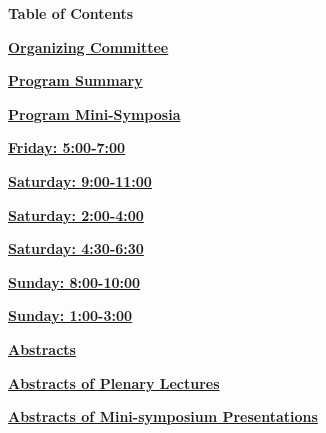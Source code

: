 \thispagestyle{empty}
\centerline{\bfseries\Large Table of Contents}
\vspace{10ex}

\noindent
\hyperref[committee]{{\bfseries\large  Organizing Committee}}
\vspace{2ex}

\vspace{4ex}
\noindent
\hyperref[programsummary]{{\bfseries\large  Program Summary}}
\vspace{2ex}

\vspace{4ex}
\noindent
\hyperref[program]{{\bfseries\large  Program Mini-Symposia}}
\vspace{2ex}

\hspace{2ex}
\hyperref[mini-friday]{{\bfseries\large  Friday: 5:00-7:00}}
\vspace{2ex}

\hspace{2ex}
\hyperref[mini-saturday1]{{\bfseries\large  Saturday: 9:00-11:00}}
\vspace{1ex}

\hspace{2ex}
\hyperref[mini-saturday2]{{\bfseries\large  Saturday: 2:00-4:00}}
\vspace{1ex}

\hspace{2ex}
\hyperref[mini-saturday3]{{\bfseries\large  Saturday: 4:30-6:30}}
\vspace{2ex}

\hspace{2ex}
\hyperref[mini-sunday1]{{\bfseries\large  Sunday: 8:00-10:00}}
\vspace{1ex}

\hspace{2ex}
\hyperref[mini-sunday2]{{\bfseries\large  Sunday: 1:00-3:00}}
\vspace{1ex}

\vspace{4ex}
\noindent
\hyperref[abstracts]{{\bfseries\large  Abstracts}}
\vspace{2ex}

\hspace{2ex}
\hyperref[plenary]{{\bfseries\large  Abstracts of Plenary Lectures}}
\vspace{2ex}

\hspace{2ex}
\hyperref[absmini]{{\bfseries\large  Abstracts of Mini-symposium Presentations}}
\vspace{1ex}


